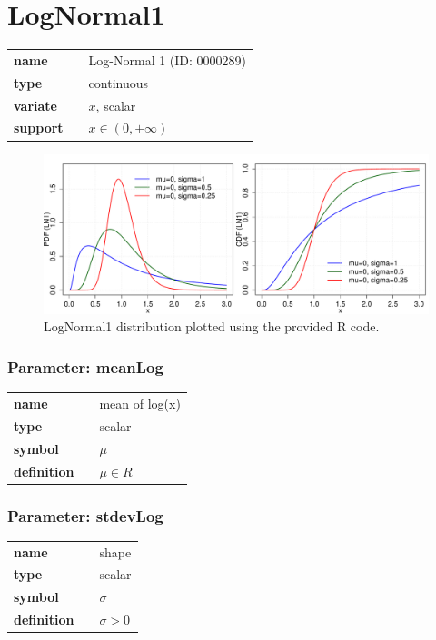 \section*{LogNormal1} 

  \bigskip 

\begin{tabular}{p{2cm}cl}
\textbf{name} & & Log-Normal 1 (ID: 0000289)\\ 
 
\textbf{type} & & continuous \\ 

\textbf{variate} & & $x$, scalar \\ 

\textbf{support} & & $x \in (0,+\infty)$
\end{tabular}

\begin{figure}[ht!]
\centering
  \includegraphics[width=140mm]{pics/LogNormal1.pdf}
 \caption{LogNormal1 distribution plotted using the provided R code.}
 \label{fig:LogNormal1}
\end{figure}

\subsubsection*{Parameter: meanLog}

\noindent\begin{tabular}{p{2cm}cl}
\textbf{name} & & mean of log(x) \\
\textbf{type} & & scalar \\
\textbf{symbol} & & $\mu$  \\
\textbf{definition} & & $\mu \in R$
\end{tabular}
\subsubsection*{Parameter: stdevLog}

\noindent\begin{tabular}{p{2cm}cl}
\textbf{name} & & shape \\
\textbf{type} & & scalar \\
\textbf{symbol} & & $\sigma$  \\
\textbf{definition} & & $\sigma > 0$
\end{tabular}
